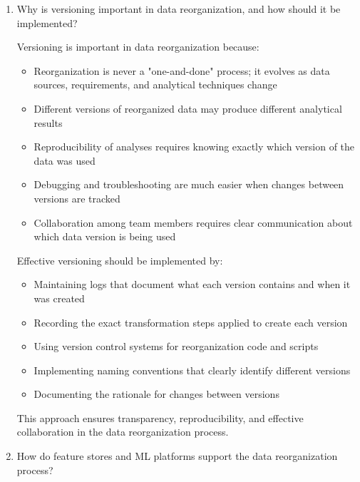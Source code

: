 \documentclass[12pt]{article}
\begin{document}
\begin{enumerate}
    \item Why is versioning important in data reorganization, and how should it be implemented?
    
    \begin{tcolorbox}[colback=blue!5!white,colframe=blue!75!black,title={Solution}]
    Versioning is important in data reorganization because:
    
    \begin{itemize}
        \item Reorganization is never a "one-and-done" process; it evolves as data sources, requirements, and analytical techniques change
        \item Different versions of reorganized data may produce different analytical results
        \item Reproducibility of analyses requires knowing exactly which version of the data was used
        \item Debugging and troubleshooting are much easier when changes between versions are tracked
        \item Collaboration among team members requires clear communication about which data version is being used
    \end{itemize}
    
    Effective versioning should be implemented by:
    
    \begin{itemize}
        \item Maintaining logs that document what each version contains and when it was created
        \item Recording the exact transformation steps applied to create each version
        \item Using version control systems for reorganization code and scripts
        \item Implementing naming conventions that clearly identify different versions
        \item Documenting the rationale for changes between versions
    \end{itemize}
    
    This approach ensures transparency, reproducibility, and effective collaboration in the data reorganization process.
    \end{tcolorbox}
    
    \item How do feature stores and ML platforms support the data reorganization process?
    

\end{enumerate}
\end{document}
